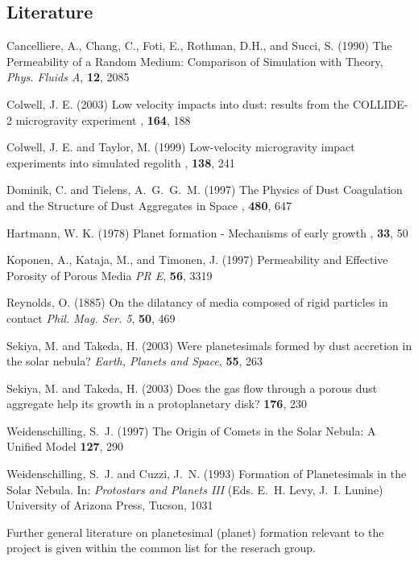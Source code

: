 \subsection{Literature}
%
%
%
\begin{literature}


\item Cancelliere, A., Chang, C., Foti, E., Rothman, D.H., and Succi, S. (1990) The
Permeability of a Random Medium: Comparison of Simulation with Theory,
\textit{Phys. Fluids A}, \textbf{12}, 2085

\item
Colwell, J. E. (2003)
Low velocity impacts into dust: results from the COLLIDE-2 microgravity experiment \ica, 
\textbf{164}, 188

\item
Colwell, J. E. and Taylor, M. (1999)
Low-velocity microgravity impact experiments into simulated regolith \ica, 
\textbf{138}, 241

\item Dominik, C. and Tielens,  A.~G.~G.~M. (1997) The Physics of
Dust Coagulation and the Structure of Dust Aggregates in Space
\ica, \textbf{480}, 647

\item
Hartmann, W. K. (1978)
Planet formation - Mechanisms of early growth \ica, \textbf{33}, 50

\item Koponen, A., Kataja, M., and Timonen, J. (1997) Permeability and Effective
Porosity of Porous Media \textit{PR E}, \textbf{56}, 3319

\item
Reynolds, O. (1885) On the dilatancy of media composed of rigid particles in contact 
\textit{Phil. Mag. Ser. 5}, \textbf{50}, 469 

\item Sekiya, M. and Takeda, H. (2003) Were planetesimals formed
by dust accretion in the solar nebula? \textit{Earth, Planets and
Space\/}, \textbf{55}, 263

\item Sekiya, M. and Takeda, H. (2003) Does the gas flow through
a porous dust aggregate help its growth in a protoplanetary disk?
\ica \textbf{176}, 230

\item Weidenschilling, S.~J. (1997) The Origin of Comets in the
Solar Nebula: A Unified Model \ica \textbf{127}, 290

\item Weidenschilling, S.~J. and Cuzzi, J.~N. (1993) Formation of
Planetesimals in the Solar Nebula. In: \textit{Protostars and
Planets III} (Eds. E.~H. Levy, J.~I. Lunine) University of Arizona
Press, Tucson, 1031

\item Further general literature on planetesimal (planet) formation relevant to the
project is given within the common list for the reserach group. 
 
\end{literature}



